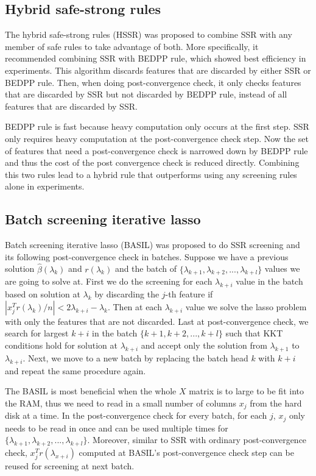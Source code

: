 \documentclass{article}
\begin{document}
\subsection{Hybrid safe-strong rules}

The hybrid safe-strong rules (HSSR) \cite{zeng2017efficient} was proposed to combine SSR with any member of safe rules to take advantage of both. More specifically, it recommended  combining SSR with BEDPP rule, which showed best efficiency in experiments. This algorithm discards features that are discarded by either SSR or BEDPP rule. Then, when doing post-convergence check, it only checks features that are discarded by SSR but not discarded by BEDPP rule, instead of all features that are discarded by SSR.

BEDPP rule is fast because heavy computation only occurs at the first step. SSR only requires heavy computation at the post-convergence check step. Now the set of features that need a post-convergence check is narrowed down by BEDPP rule and thus the cost of the post convergence check is reduced directly. Combining this two rules lead to a hybrid rule that outperforms using any screening rules alone in experiments.

\subsection{Batch screening iterative lasso}

Batch screening iterative lasso (BASIL) \cite{qian2019fast} was proposed to do SSR screening and its following post-convergence check in batches. Suppose we have a previous solution $\hat{\beta}(\lambda_k)$ and $r(\lambda_k)$ and the batch of $\{\lambda_{k+1},\lambda_{k+2},...,\lambda_{k+l}\}$ values we are going to solve at. First we do the screening for each $\lambda_{k+i}$ value in the batch based on solution at $\lambda_k$ by discarding the $j$-th feature if $|x_j^Tr(\lambda_k)/n|<2\lambda_{k+i}-\lambda_k$. Then at each $\lambda_{k+i}$ value we solve the lasso problem with only the features that are not discarded. Last at post-convergence check, we search for largest $k+i$ in the batch $\{k+1,k+2,...,k+l\}$ such that KKT conditions hold for solution at $\lambda_{k+i}$ and accept only the solution from $\lambda_{k+1}$ to $\lambda_{k+i}$. Next, we move to a new batch by replacing the batch head $k$ with $k+i$ and repeat the same procedure again.

The BASIL is most beneficial when the whole $X$ matrix is to large to be fit into the RAM, thus we need to read in a small number of columns $x_j$ from the hard disk at a time. In the post-convergence check for every batch, for each $j$, $x_j$ only needs to be read in once and can be used multiple times for $\{\lambda_{k+1},\lambda_{k+2},...,\lambda_{k+l}\}$. Moreover, similar to SSR with ordinary post-convergence check, $x_j^Tr(\lambda_{x+i})$ computed at BASIL's post-convergence check step can be reused for screening at next batch.
\end{document}
